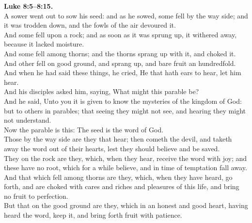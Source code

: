 \documentclass[10pt]{article} %
\begin{document}
{\begin{minipage}[t]{0.45\textwidth}
\textbf{Luke 8:5--8:15.}\\
A sower went out to sow his seed: and as he sowed, some fell by the way side; and it was trodden down, and the fowls of the air devoured it.\\
And some fell upon a rock; and as soon as it was sprung up, it withered away, because it lacked moisture.\\
And some fell among thorns; and the thorns sprang up with it, and choked it.\\
And other fell on good ground, and sprang up, and bare fruit an hundredfold. And when he had said these things, he cried, He that hath ears to hear, let him hear.\\
And his disciples asked him, saying, What might this parable be?\\
And he said, Unto you it is given to know the mysteries of the kingdom of God: but to others in parables; that seeing they might not see, and hearing they might not understand.\\
Now the parable is this: The seed is the word of God.\\
Those by the way side are they that hear; then cometh the devil, and taketh away the word out of their hearts, lest they should believe and be saved.\\
They on the rock are they, which, when they hear, receive the word with joy; and these have no root, which for a while believe, and in time of temptation fall away.\\
And that which fell among thorns are they, which, when they have heard, go forth, and are choked with cares and riches and pleasures of this life, and bring no fruit to perfection.\\
But that on the good ground are they, which in an honest and good heart, having heard the word, keep it, and bring forth fruit with patience.\\

\end{minipage}}
\vspace*{\fill}
\newpage
\Huge%
\vspace*{\fill}
\end{document}
